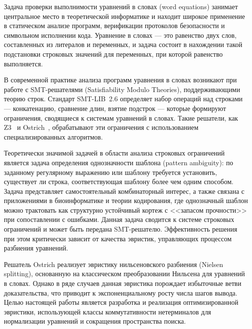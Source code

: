 \documentclass[14pt, russian]{scrartcl}
\begin{document}
\setlength{\tabcolsep}{3pt}
\newpage
\setcounter{page}{2}

\renewcommand\contentsname{\hfill{\normalfont{СОДЕРЖАНИЕ}}\hfill}
\tableofcontents
\newpage


Задача проверки выполнимости уравнений в словах (word equations) занимает центральное
место в теоретической информатике и находит широкое применение в статическом анализе
программ, верификации протоколов безопасности и символьном исполнении кода.
Уравнение в словах --- это равенство двух слов, составленных из литералов и переменных,
и задача состоит в нахождении такой подстановки строковых значений для переменных,
при которой равенство выполняется.

В современной практике анализа программ уравнения в словах возникают при работе с
SMT-решателями (Satisfiability Modulo Theories), поддерживающими теорию строк. Стандарт
SMT-LIB~2.6 определяет набор операций над строками --- конкатенацию, сравнение длин,
взятие подстрок --- которые формируют ограничения, сводящиеся к системам уравнений в словах.
Такие решатели, как Z3~\cite{demoura2008} и Ostrich~\cite{chen2022}, обрабатывают эти
ограничения с использованием специализированных алгоритмов.

Теоретически значимой задачей в области анализа строковых ограничений является задача
определения однозначности шаблона (pattern ambiguity): по заданному регулярному выражению
или шаблону требуется установить, существует ли строка, соответствующая шаблону более чем
одним способом. Задача представляет самостоятельный комбинаторный интерес, а также
связана с приложениями в биоинформатике и теории кодирования, где однозначный шаблон
можно трактовать как структурно устойчивый кортеж с <<запасом прочности>> при
сопоставлении с ошибками. Данная задача сводится к системе строковых ограничений и может
быть передана SMT-решателю. Эффективность решения при этом критически зависит от качества
эвристик, управляющих процессом разбиения уравнений.

Решатель Ostrich реализует эвристику нильсеновского разбиения (Nielsen splitting),
основанную на классическом преобразовании Нильсена для уравнений в словах. Однако в
ряде случаев данная эвристика порождает избыточные ветви доказательства, что приводит
к экспоненциальному росту числа шагов вывода. Целью настоящей работы является
разработка и реализация оптимизированной эвристики, использующей классы коммутативности
нетерминалов для нормализации уравнений и сокращения пространства поиска.
\end{document}
